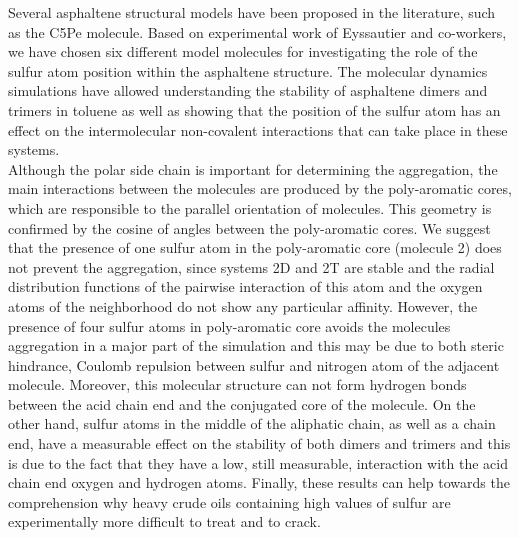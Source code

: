 Several asphaltene structural models have been proposed in the literature, such as the C5Pe molecule. Based on experimental work of Eyssautier and co-workers,\cite{eyssautier2011insight} we have chosen six different model molecules for investigating the role of the sulfur atom position within the asphaltene structure. The molecular dynamics simulations have allowed understanding the stability of asphaltene dimers and trimers in toluene as well as showing that the position of the sulfur atom has an effect on the intermolecular non-covalent interactions that can take place in these systems.\\ 

Although the polar side chain is important for determining the aggregation, the main interactions between the molecules are produced by the poly-aromatic cores, which are responsible to the parallel orientation of molecules. This geometry is confirmed by the cosine of angles between the poly-aromatic cores. 
We suggest that the presence of one sulfur atom in the poly-aromatic core (molecule 2) does not prevent the aggregation, since systems 2D and 2T are stable and the radial distribution functions of the pairwise interaction of this atom and the oxygen atoms of the neighborhood do not show any particular affinity. However, the presence of four sulfur atoms in poly-aromatic core avoids the molecules aggregation in a major part of the simulation and this may be due to both steric hindrance, Coulomb repulsion between sulfur and nitrogen atom of the adjacent molecule. Moreover, this molecular structure can not form hydrogen bonds between the acid chain end and the conjugated core of the molecule. On the other hand, sulfur atoms in the middle of the aliphatic chain, as well as a chain end, have a measurable effect on the stability of both dimers and trimers and this is due to the fact that they have a low, still measurable, interaction with the acid chain end oxygen and hydrogen atoms. Finally, these results can help towards the comprehension why heavy crude oils containing high values of sulfur are experimentally more difficult to treat and to crack.\\

